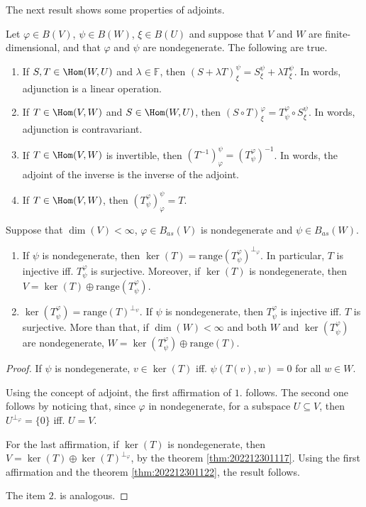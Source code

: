 The next result shows some properties of adjoints.

\begin{theorem}
  Let $\varphi \in B(V)$, $\psi \in B(W)$, $\xi \in B(U)$ and suppose that $V$ and $W$ are finite-dimensional, and that $\varphi$ and $\psi$ are nondegenerate. The following are true. 
  \begin{enumerate}
    \item If $S, T \in \Hom(W, U)$ and $\lambda \in \mathbb{F}$, then $(S + \lambda T)_\xi^\psi = S_\xi^\psi + \lambda T_\xi^\psi$. In words, adjunction is a linear operation.
    \item If $T \in \Hom(V, W)$ and $S \in \Hom(W,U)$, then $(S \circ T)_\xi^\varphi = T_\psi^\varphi \circ S_\xi^\psi$. In words, adjunction is contravariant. 
    \item If $T \in \Hom(V, W)$ is invertible, then $(T^{-1})_\varphi^\psi = (T_\psi^\varphi)^{-1}$. In words, the adjoint of the inverse is the inverse of the adjoint. 
    \item If $T \in \Hom(V, W)$, then $(T_\psi^\varphi)_\varphi^\psi = T$.
  \end{enumerate}
\end{theorem}

\begin{lemma}
  Suppose that $\dim(V) < \infty$, $\varphi \in B_{as}(V)$ is nondegenerate and $\psi \in B_{as}(W)$. 

  \begin{enumerate}
    \item If $\psi$ is nondegenerate, then $\ker(T) = \text{range}(T_\psi^\varphi)^{\perp_\varphi}$. In particular, $T$ is injective iff. $T_\psi^\varphi$ is surjective. Moreover, if $\ker(T)$ is nondegenerate, then $V = \ker(T) \oplus \text{range}(T_\psi^\varphi)$. 
    \item $\ker(T_\psi^\varphi) = \text{range}(T)^{\perp_\psi}$. If $\psi$ is nondegenerate, then $T_\psi^\varphi$ is injective iff. $T$ is surjective. More than that, if $\dim(W) < \infty$ and both $W$ and $\ker(T_\psi^\varphi)$ are nondegenerate, $W = \ker(T_\psi^\varphi) \oplus \text{range}(T)$.
  \end{enumerate}
\end{lemma}

\begin{proof}
  If $\psi$ is nondegenerate, $v \in \ker(T)$ iff. $\psi(T(v), w) = 0$ for all $w \in W$.
  
  Using the concept of adjoint, the first affirmation of $1.$ follows. The second one follows by noticing that, since $\varphi$ in nondegenerate, for a subspace $U \subseteq V$, then $U^{\perp_\varphi} = \{ 0 \}$ iff. $U = V$.

  For the last affirmation, if $\ker(T)$ is nondegenerate, then $V = \ker(T) \oplus \ker(T)^{\perp_\varphi}$, by the theorem \ref{thm:202212301117}. Using the first affirmation and the theorem \ref{thm:202212301122}, the result follows. 

  The item $2.$ is analogous. 
\end{proof}

